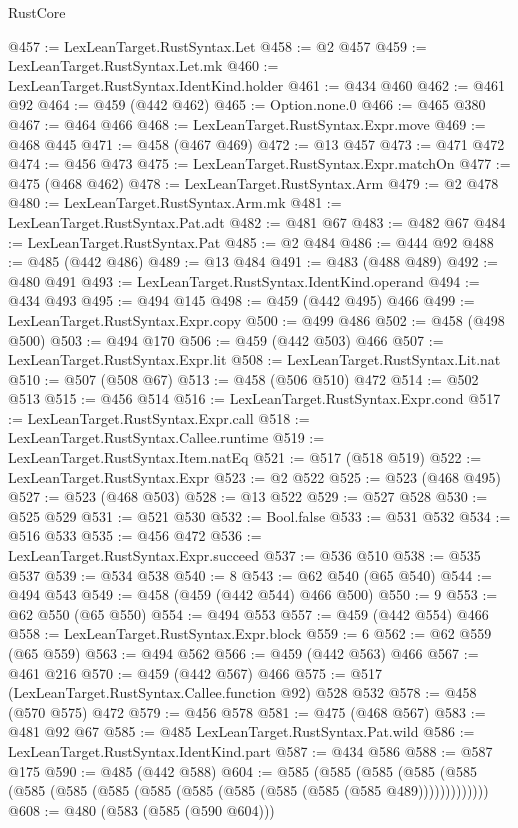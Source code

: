 \begin{lexlean}{RustCore}
\begin{coremodule}
@457 := LexLeanTarget.RustSyntax.Let
@458 := @2 @457
@459 := LexLeanTarget.RustSyntax.Let.mk
@460 := LexLeanTarget.RustSyntax.IdentKind.holder
@461 := @434 @460
@462 := @461 @92
@464 := @459 (@442 @462)
@465 := Option.none.{0}
@466 := @465 @380
@467 := @464 @466
@468 := LexLeanTarget.RustSyntax.Expr.move
@469 := @468 @445
@471 := @458 (@467 @469)
@472 := @13 @457
@473 := @471 @472
@474 := @456 @473
@475 := LexLeanTarget.RustSyntax.Expr.matchOn
@477 := @475 (@468 @462)
@478 := LexLeanTarget.RustSyntax.Arm
@479 := @2 @478
@480 := LexLeanTarget.RustSyntax.Arm.mk
@481 := LexLeanTarget.RustSyntax.Pat.adt
@482 := @481 @67
@483 := @482 @67
@484 := LexLeanTarget.RustSyntax.Pat
@485 := @2 @484
@486 := @444 @92
@488 := @485 (@442 @486)
@489 := @13 @484
@491 := @483 (@488 @489)
@492 := @480 @491
@493 := LexLeanTarget.RustSyntax.IdentKind.operand
@494 := @434 @493
@495 := @494 @145
@498 := @459 (@442 @495) @466
@499 := LexLeanTarget.RustSyntax.Expr.copy
@500 := @499 @486
@502 := @458 (@498 @500)
@503 := @494 @170
@506 := @459 (@442 @503) @466
@507 := LexLeanTarget.RustSyntax.Expr.lit
@508 := LexLeanTarget.RustSyntax.Lit.nat
@510 := @507 (@508 @67)
@513 := @458 (@506 @510) @472
@514 := @502 @513
@515 := @456 @514
@516 := LexLeanTarget.RustSyntax.Expr.cond
@517 := LexLeanTarget.RustSyntax.Expr.call
@518 := LexLeanTarget.RustSyntax.Callee.runtime
@519 := LexLeanTarget.RustSyntax.Item.natEq
@521 := @517 (@518 @519)
@522 := LexLeanTarget.RustSyntax.Expr
@523 := @2 @522
@525 := @523 (@468 @495)
@527 := @523 (@468 @503)
@528 := @13 @522
@529 := @527 @528
@530 := @525 @529
@531 := @521 @530
@532 := Bool.false
@533 := @531 @532
@534 := @516 @533
@535 := @456 @472
@536 := LexLeanTarget.RustSyntax.Expr.succeed
@537 := @536 @510
@538 := @535 @537
@539 := @534 @538
@540 := 8
@543 := @62 @540 (@65 @540)
@544 := @494 @543
@549 := @458 (@459 (@442 @544) @466 @500)
@550 := 9
@553 := @62 @550 (@65 @550)
@554 := @494 @553
@557 := @459 (@442 @554) @466
@558 := LexLeanTarget.RustSyntax.Expr.block
@559 := 6
@562 := @62 @559 (@65 @559)
@563 := @494 @562
@566 := @459 (@442 @563) @466
@567 := @461 @216
@570 := @459 (@442 @567) @466
@575 := @517 (LexLeanTarget.RustSyntax.Callee.function @92) @528 @532
@578 := @458 (@570 @575) @472
@579 := @456 @578
@581 := @475 (@468 @567)
@583 := @481 @92 @67
@585 := @485 LexLeanTarget.RustSyntax.Pat.wild
@586 := LexLeanTarget.RustSyntax.IdentKind.part
@587 := @434 @586
@588 := @587 @175
@590 := @485 (@442 @588)
@604 := @585
    (@585 (@585 (@585 (@585 (@585 (@585 (@585 (@585 (@585 (@585 (@585 (@585 (@585 @489)))))))))))))
@608 := @480 (@583 (@585 (@590 @604)))

\end{coremodule}
\end{lexlean}
